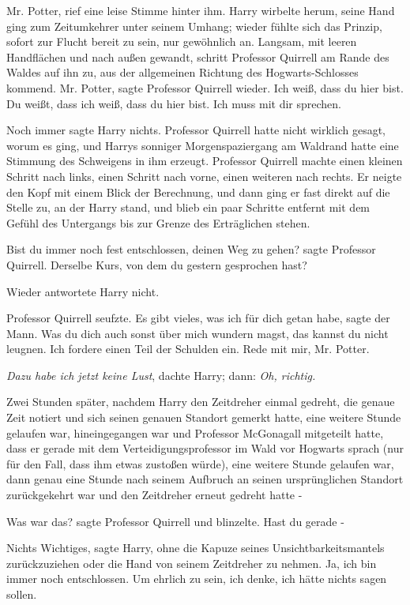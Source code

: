 \glqq{}Mr. Potter\grqq{}, rief eine leise Stimme hinter ihm. Harry wirbelte
herum, seine Hand ging zum Zeitumkehrer unter seinem Umhang; wieder fühlte sich
das Prinzip, sofort zur Flucht bereit zu sein, nur gewöhnlich an. Langsam, mit
leeren Handflächen und nach außen gewandt, schritt Professor Quirrell am Rande
des Waldes auf ihn zu, aus der allgemeinen Richtung des Hogwarts-Schlosses
kommend. \glqq{}Mr. Potter\grqq{}, sagte Professor Quirrell wieder. \glqq{}Ich
weiß, dass du hier bist. Du weißt, dass ich weiß, dass du hier bist. Ich muss
mit dir sprechen.\grqq{}

Noch immer sagte Harry nichts. Professor Quirrell hatte nicht wirklich gesagt,
worum es ging, und Harrys sonniger Morgenspaziergang am Waldrand hatte eine
Stimmung des Schweigens in ihm erzeugt. Professor Quirrell machte einen kleinen
Schritt nach links, einen Schritt nach vorne, einen weiteren nach rechts. Er
neigte den Kopf mit einem Blick der Berechnung, und dann ging er fast direkt auf
die Stelle zu, an der Harry stand, und blieb ein paar Schritte entfernt mit dem
Gefühl des Untergangs bis zur Grenze des Erträglichen stehen.

\glqq{}Bist du immer noch fest entschlossen, deinen Weg zu gehen?\grqq{} sagte
Professor Quirrell. \glqq{}Derselbe Kurs, von dem du gestern gesprochen
hast?\grqq{}

Wieder antwortete Harry nicht.

Professor Quirrell seufzte. \glqq{}Es gibt vieles, was ich für dich getan
habe\grqq{}, sagte der Mann. \glqq{}Was du dich auch sonst über mich wundern
magst, das kannst du nicht leugnen. Ich fordere einen Teil der Schulden ein.
Rede mit mir, Mr. Potter.\grqq{}

\emph{Dazu habe ich jetzt keine Lust}, dachte Harry; dann:\emph{ Oh, richtig.}

Zwei Stunden später, nachdem Harry den Zeitdreher einmal gedreht, die genaue
Zeit notiert und sich seinen genauen Standort gemerkt hatte, eine weitere Stunde
gelaufen war, hineingegangen war und Professor McGonagall mitgeteilt hatte, dass
er gerade mit dem Verteidigungsprofessor im Wald vor Hogwarts sprach (nur für
den Fall, dass ihm etwas zustoßen würde), eine weitere Stunde gelaufen war, dann
genau eine Stunde nach seinem Aufbruch an seinen ursprünglichen Standort
zurückgekehrt war und den Zeitdreher erneut gedreht hatte -

\glqq{}Was war das?\grqq{} sagte Professor Quirrell und blinzelte. \glqq{}Hast du
gerade -\grqq{}

\glqq{}Nichts Wichtiges\grqq{}, sagte Harry, ohne die Kapuze seines
Unsichtbarkeitsmantels zurückzuziehen oder die Hand von seinem Zeitdreher zu
nehmen. \glqq{}Ja, ich bin immer noch entschlossen. Um ehrlich zu sein, ich
denke, ich hätte nichts sagen sollen.\grqq{}

